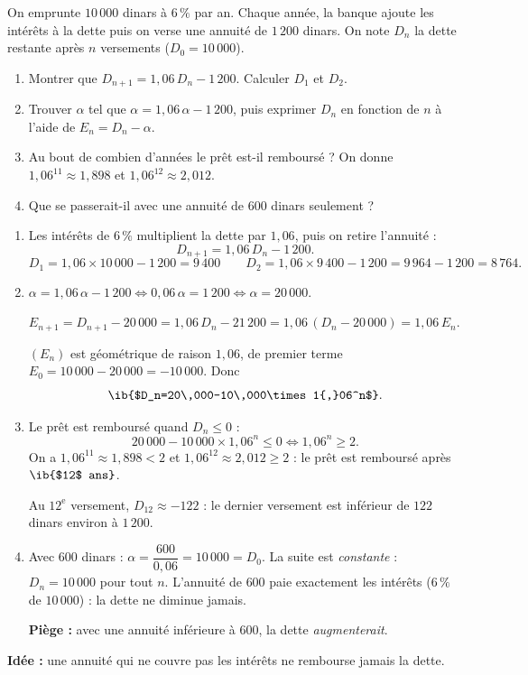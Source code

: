 
On emprunte $10\,000$ dinars à $6\,\%$ par an. Chaque année, la banque ajoute les intérêts à la dette puis on verse une annuité de $1\,200$ dinars. On note $D_n$ la dette restante après $n$ versements ($D_0=10\,000$).

\begin{enumerate}
  \item Montrer que $D_{n+1}=1{,}06\,D_n-1\,200$. Calculer $D_1$ et $D_2$.
  \item Trouver $\alpha$ tel que $\alpha=1{,}06\,\alpha-1\,200$, puis exprimer $D_n$ en fonction de $n$ à l'aide de $E_n=D_n-\alpha$.
  \item Au bout de combien d'années le prêt est-il remboursé ? On donne $1{,}06^{11}\approx1{,}898$ et $1{,}06^{12}\approx2{,}012$.
  \item Que se passerait-il avec une annuité de $600$ dinars seulement ?
\end{enumerate}

\begin{enumerate}
  \item Les intérêts de $6\,\%$ multiplient la dette par $1{,}06$, puis on retire l'annuité :
  $$D_{n+1}=1{,}06\,D_n-1\,200.$$
  $$D_1=1{,}06\times10\,000-1\,200=9\,400\qquad D_2=1{,}06\times9\,400-1\,200=9\,964-1\,200=8\,764.$$
  \item $\alpha=1{,}06\,\alpha-1\,200\iff0{,}06\,\alpha=1\,200\iff\alpha=20\,000$.

  $E_{n+1}=D_{n+1}-20\,000=1{,}06\,D_n-21\,200=1{,}06\,(D_n-20\,000)=1{,}06\,E_n$.

  $(E_n)$ est géométrique de raison $1{,}06$, de premier terme $E_0=10\,000-20\,000=-10\,000$. Donc
  $$ \ib{$D_n=20\,000-10\,000\times1{,}06^n$}.$$
  \item Le prêt est remboursé quand $D_n\le0$ :
  $$20\,000-10\,000\times1{,}06^n\le0\iff1{,}06^n\ge2.$$
  On a $1{,}06^{11}\approx1{,}898<2$ et $1{,}06^{12}\approx2{,}012\ge2$ : le prêt est remboursé après $\ib{$12$ ans}$.

  Au $12^{\text{e}}$ versement, $D_{12}\approx-122$ : le dernier versement est inférieur de $122$ dinars environ à $1\,200$.
  \item Avec $600$ dinars : $\alpha=\dfrac{600}{0{,}06}=10\,000=D_0$. La suite est \emph{constante} : $D_n=10\,000$ pour tout $n$. L'annuité de $600$ paie exactement les intérêts ($6\,\%$ de $10\,000$) : la dette ne diminue jamais.

  \textbf{Piège :} avec une annuité inférieure à $600$, la dette \emph{augmenterait}.
\end{enumerate}

\textbf{Idée :} une annuité qui ne couvre pas les intérêts ne rembourse jamais la dette.
